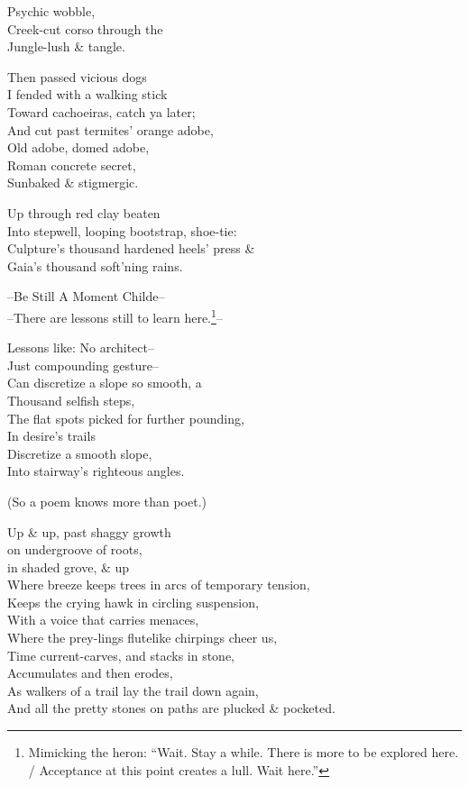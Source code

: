 Psychic wobble, \\
Creek-cut corso through the \\
Jungle-lush \& tangle.

Then passed vicious dogs \\
I fended with a walking stick \\
Toward cachoeiras, catch ya later; \\
And cut past termites' orange adobe, \\
Old adobe, domed adobe, \\
Roman concrete secret, \\
Sunbaked \& stigmergic.

Up through red clay beaten \\
Into stepwell, looping bootstrap, shoe-tie: \\
Culpture's thousand hardened heels' press \& \\
Gaia's thousand soft'ning rains.

--Be Still A Moment Childe-- \\
--There are lessons still to learn here.\footnote{Mimicking the heron: ``Wait. Stay a while. There is more to be explored here. / Acceptance at this point creates a lull. Wait here.''}--

Lessons like: No architect--\\
Just compounding gesture-- \\
Can discretize a slope so smooth, a \\
Thousand selfish steps, \\
The flat spots picked for further pounding, \\
In desire's trails \\
Discretize a smooth slope, \\ 
Into stairway's righteous angles.

(So a poem knows more than poet.)

Up \& up, past shaggy growth \\
on undergroove of roots, \\
in shaded grove, \& up \\
Where breeze keeps trees in arcs of temporary tension, \\
Keeps the crying hawk in circling suspension, \\
With a voice that carries menaces, \\
Where the prey-lings flutelike chirpings cheer us, \\
Time current-carves, and stacks in stone, \\
Accumulates and then erodes, \\
As walkers of a trail lay the trail down again, \\
And all the pretty stones on paths are plucked \& pocketed.

